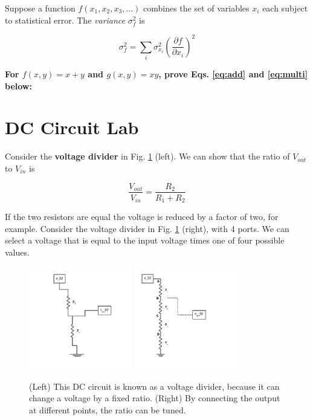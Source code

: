 \documentclass[12pt]{article}
\begin{document}
Suppose a function $f(x_1,x_2,x_3,...)$ combines the set of variables $x_i$ each subject to statistical error.  The \textit{variance} $\sigma_f^2$ is

\begin{equation}
\sigma_f^2 = \sum_i \sigma_{x_i}^2 \left( \frac{\partial f}{\partial x_i} \right)^2
\end{equation}

\textbf{For $f(x,y) = x+y$ and $g(x,y) = xy$, prove Eqs. \ref{eq:add} and \ref{eq:multi} below:} \\ \vspace{3cm}

\section{DC Circuit Lab}

Consider the \textbf{voltage divider} in Fig. \ref{fig:vd} (left).  We can show that the ratio of $V_{out}$ to $V_{in}$ is

\begin{equation}
\frac{V_{out}}{V_{in}} = \frac{R_2}{R_1+R_2}
\end{equation}

If the two resistors are equal the voltage is reduced by a factor of two, for example.  Consider the voltage divider in Fig. \ref{fig:vd} (right), with 4 ports.  We can select a voltage that is equal to the input voltage times one of four possible values.

\begin{figure}[hb]
\centering
\includegraphics[width=0.4\textwidth]{figures/VoltageDivider.pdf}
\includegraphics[width=0.4\textwidth]{figures/VoltageDivider2.pdf}
\caption{\label{fig:vd} (Left) This DC circuit is known as a voltage divider, because it can change a voltage by a fixed ratio. (Right) By connecting the output at different points, the ratio can be tuned.}
\end{figure}
\end{document}
